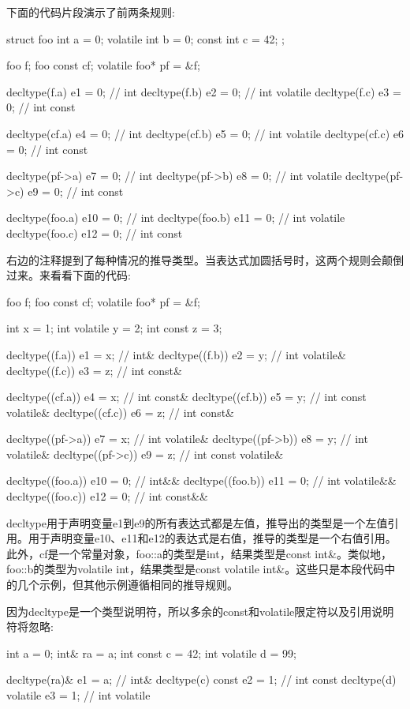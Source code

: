 下面的代码片段演示了前两条规则:

\begin{cpp}
struct foo
{
	int a = 0;
	volatile int b = 0;
	const int c = 42;
};

foo f;
foo const cf;
volatile foo* pf = &f;

decltype(f.a) e1 = 0; // int
decltype(f.b) e2 = 0; // int volatile
decltype(f.c) e3 = 0; // int const

decltype(cf.a) e4 = 0; // int
decltype(cf.b) e5 = 0; // int volatile
decltype(cf.c) e6 = 0; // int const

decltype(pf->a) e7 = 0; // int
decltype(pf->b) e8 = 0; // int volatile
decltype(pf->c) e9 = 0; // int const

decltype(foo{}.a) e10 = 0; // int
decltype(foo{}.b) e11 = 0; // int volatile
decltype(foo{}.c) e12 = 0; // int const
\end{cpp}

右边的注释提到了每种情况的推导类型。当表达式加圆括号时，这两个规则会颠倒过来。来看看下面的代码:

\begin{cpp}
foo f;
foo const cf;
volatile foo* pf = &f;

int x = 1;
int volatile y = 2;
int const z = 3;

decltype((f.a)) e1 = x; // int&
decltype((f.b)) e2 = y; // int volatile&
decltype((f.c)) e3 = z; // int const&

decltype((cf.a)) e4 = x; // int const&
decltype((cf.b)) e5 = y; // int const volatile&
decltype((cf.c)) e6 = z; // int const&

decltype((pf->a)) e7 = x; // int volatile&
decltype((pf->b)) e8 = y; // int volatile&
decltype((pf->c)) e9 = z; // int const volatile&

decltype((foo{}.a)) e10 = 0; // int&&
decltype((foo{}.b)) e11 = 0; // int volatile&&
decltype((foo{}.c)) e12 = 0; // int const&&
\end{cpp}

decltype用于声明变量e1到e9的所有表达式都是左值，推导出的类型是一个左值引用。用于声明变量e10、e11和e12的表达式是右值，推导的类型是一个右值引用。此外，cf是一个常量对象，foo::a的类型是int，结果类型是const int\&。类似地，foo::b的类型为volatile int，结果类型是const volatile int\&。这些只是本段代码中的几个示例，但其他示例遵循相同的推导规则。

因为decltype是一个类型说明符，所以多余的const和volatile限定符以及引用说明符将忽略:

\begin{cpp}
int a = 0;
int& ra = a;
int const c = 42;
int volatile d = 99;

decltype(ra)& e1 = a; // int&
decltype(c) const e2 = 1; // int const
decltype(d) volatile e3 = 1; // int volatile
\end{cpp}

